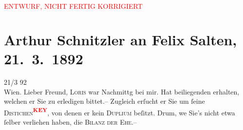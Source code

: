 
\begin{center}
            \textcolor{red}{ENTWURF, NICHT FERTIG KORRIGIERT}
                      \end{center}
            
         
         \renewcommand{\erwaehntePersonen}{Personen: Max Henze, Hugo von Hofmannsthal, Felix Salten}
         \renewcommand{\erwaehnteInstitutionen}{Institutionen: Allgemeine Theater-Revue für Bühne und Welt. Illustrierte Halbmonatsschrift}
         \renewcommand{\erwaehnteOrte}{Orte: Berlin, Café Central, Wien}
         \renewcommand{\erwaehnteWerke}{Werke: Der Tod des Tizian, Die Bilanz der Ehe. Novellistische Studien}
               \section[Arthur Schnitzler an Felix Salten, 21. 3. 1892]{ Arthur Schnitzler an Felix Salten, 21. 3. 1892}\nopagebreak{}\rehead{ }\begin{ledgroupsized}[t]{13cm}\normalsize\beginnumbering \toendnotes[C]{\smallbreak\pagebreak[2]} 
\toendnotes[C]{\smallbreak}\pstart
           \raggedleft{}{\pb}21/3 92{\\}Wien. \pend
           \pstart{}Lieber Freund,\pend\pstart
           \textsc{Loris} war Nachmittg bei mir. Hat beiliegenden \label{K_L02955-1v}\label{K_L02955-1h} erhalten, welchen er Sie zu erledigen bittet.– Zugleich
               erſucht er Sie um ſeine \textsc{Distichen\textcolor{red}{\textsuperscript{\textbf{KEY}}}}, von denen er kein \textsc{Duplium} beſitzt. Drum, we{\geminationn} Sie’s {\pb}nicht
               etwa ſelber verliehen haben, die \textsc{Bilanz der Ehe}.– \pend

\end{ledgroupsized}
